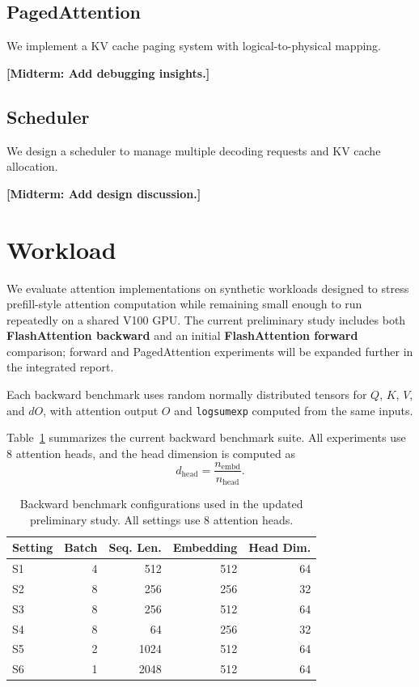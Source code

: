 \documentclass{article}
\begin{document}
\subsection{PagedAttention}

We implement a KV cache paging system with logical-to-physical mapping.

\textbf{[Midterm: Add debugging insights.]}

\subsection{Scheduler}

We design a scheduler to manage multiple decoding requests and KV cache allocation.

\textbf{[Midterm: Add design discussion.]}

\section{Workload}

We evaluate attention implementations on synthetic workloads designed to stress prefill-style attention computation while remaining small enough to run repeatedly on a shared V100 GPU. The current preliminary study includes both \textbf{FlashAttention backward} and an initial \textbf{FlashAttention forward} comparison; forward and PagedAttention experiments will be expanded further in the integrated report.

Each backward benchmark uses random normally distributed tensors for $Q$, $K$, $V$, and $dO$, with attention output $O$ and \texttt{logsumexp} computed from the same inputs.

Table~\ref{tab:backward-workloads} summarizes the current backward benchmark suite. All experiments use 8 attention heads, and the head dimension is computed as
\[
d_{\text{head}} = \frac{n_{\text{embd}}}{n_{\text{head}}}.
\]

\begin{table}[t]
\centering
\small
\begin{tabular}{lrrrr}
\toprule
Setting & Batch & Seq. Len. & Embedding & Head Dim. \\
\midrule
S1 & 4 & 512 & 512 & 64 \\
S2 & 8 & 256 & 256 & 32 \\
S3 & 8 & 256 & 512 & 64 \\
S4 & 8 & 64 & 256 & 32 \\
S5 & 2 & 1024 & 512 & 64 \\
S6 & 1 & 2048 & 512 & 64 \\
\bottomrule
\end{tabular}
\caption{Backward benchmark configurations used in the updated preliminary study. All settings use 8 attention heads.}
\label{tab:backward-workloads}
\end{table}
\end{document}
